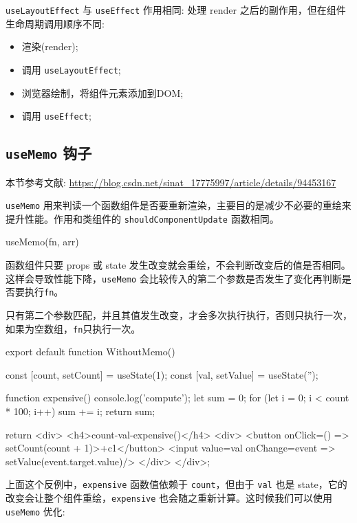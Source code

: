 \texttt{useLayoutEffect} 与 \texttt{useEffect} 作用相同: 处理 render 之后的副作用，但在组件生命周期调用顺序不同:

\begin{itemize}
  \item 渲染(render);
  \item 调用 \texttt{useLayoutEffect};
  \item 浏览器绘制，将组件元素添加到DOM;
  \item 调用 \texttt{useEffect};
\end{itemize}

\subsection{\texttt{useMemo} 钩子}

本节参考文献: \url{https://blog.csdn.net/sinat_17775997/article/details/94453167}

\texttt{useMemo} 用来判读一个函数组件是否要重新渲染，主要目的是减少不必要的重绘来提升性能。作用和类组件的 \texttt{shouldComponentUpdate} 函数相同。

\begin{JavaScript}
useMemo(fn, arr)
\end{JavaScript}

函数组件只要 props 或 state 发生改变就会重绘，不会判断改变后的值是否相同。这样会导致性能下降，\texttt{useMemo} 会比较传入的第二个参数是否发生了变化再判断是否要执行\texttt{fn}。

只有第二个参数匹配，并且其值发生改变，才会多次执行执行，否则只执行一次，如果为空数组，\texttt{fn}只执行一次。

\begin{JavaScript}
export default function WithoutMemo() {
    const [count, setCount] = useState(1);
    const [val, setValue] = useState('');
 
    function expensive() {
        console.log('compute');
        let sum = 0;
        for (let i = 0; i < count * 100; i++) {
            sum += i;
        }
        return sum;
    }
 
    return <div>
        <h4>{count}-{val}-{expensive()}</h4>
        <div>
            <button onClick={() => setCount(count + 1)}>+c1</button>
            <input value={val} onChange={event => setValue(event.target.value)}/>
        </div>
    </div>;
}
\end{JavaScript}

上面这个反例中，\texttt{expensive} 函数值依赖于 \texttt{count}，但由于 \texttt{val} 也是 state，它的改变会让整个组件重绘，\texttt{expensive} 也会随之重新计算。这时候我们可以使用 \texttt{useMemo} 优化:

